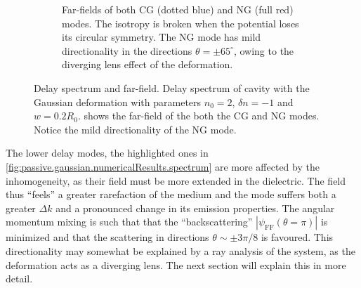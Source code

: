\begin{figure}
\begin{subfigure}{0.39\textwidth}
  \caption{Far-fields of both CG (dotted blue) and NG (full red) modes. The isotropy is broken 
	  when the potential loses its circular symmetry. The NG mode has mild directionality
	  in the directions $\theta=\pm65^\circ$, owing to the diverging lens effect of the deformation.}
  \label{fig:passive.gaussian.numericalResults.farField}
 \end{subfigure}
 \caption[Delay spectrum of the Gaussian cavity and the far-fields of two chosen modes]
	  {Delay spectrum and far-field. \textbf{} 
	  Delay spectrum of cavity with the Gaussian deformation with parameters $n_0=2$, $\delta n=-1$ and $w=0.2R_0$.
	  \textbf{} shows the far-field of the both the CG and NG modes.
	  Notice the mild directionality of the NG mode.}
 \label{fig:passive.gaussian.numericalResults}
\end{figure}

The lower delay modes, the highlighted ones in \ref{fig:passive.gaussian.numericalResults.spectrum}
are more affected by the inhomogeneity, as their field must be more
extended in the dielectric. The field thus ``feels'' a greater
rarefaction of the medium and the mode suffers both a greater $\Delta k$
and a pronounced change in its emission properties. The angular momentum
mixing is such that that the ``backscattering'' $|\psi_\text{FF}(\theta=\pi)|$
is minimized and that the scattering in directions $\theta\sim\pm3\pi/8$
is favoured. This directionality may somewhat be explained by a
ray analysis of the system, as the deformation acts as a diverging
lens. The next section will explain this in more detail. 

